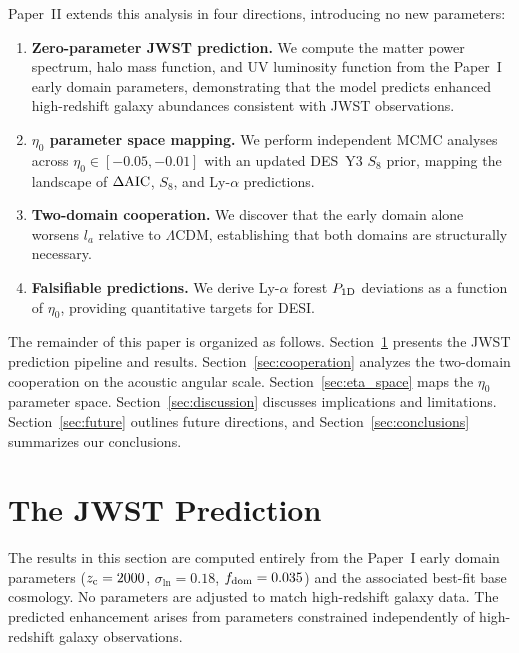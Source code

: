 \documentclass[aps,prd,twocolumn,superscriptaddress,nofootinbib]{revtex4-2}
\newcommand{\fdom}{f_{\rm dom}}
\newcommand{\zc}{z_{\rm c}}
\newcommand{\sln}{\sigma_{\ln}}
\newcommand{\dAIC}{\Delta{\rm AIC}}
\begin{document}
Paper~II extends this analysis in four directions, introducing no
new parameters:
\begin{enumerate}
\item[(a)] \textbf{Zero-parameter JWST prediction.} We compute the
matter power spectrum, halo mass function, and UV luminosity
function from the Paper~I early domain parameters, demonstrating
that the model predicts enhanced high-redshift galaxy abundances
consistent with JWST observations.
\item[(b)] \textbf{$\eta_0$ parameter space mapping.} We perform
independent MCMC analyses across $\eta_0 \in [-0.05, -0.01]$ with
an updated DES~Y3 $S_8$ prior, mapping the landscape of $\dAIC$,
$S_8$, and Ly-$\alpha$ predictions.
\item[(c)] \textbf{Two-domain cooperation.} We discover that the
early domain alone worsens $l_a$ relative to $\Lambda$CDM,
establishing that both domains are structurally necessary.
\item[(d)] \textbf{Falsifiable predictions.} We derive Ly-$\alpha$
forest $P_{1{\rm D}}$ deviations as a function of $\eta_0$,
providing quantitative targets for DESI.
\end{enumerate}

The remainder of this paper is organized as follows.
Section~\ref{sec:jwst} presents the JWST prediction pipeline and
results. Section~\ref{sec:cooperation} analyzes the two-domain
cooperation on the acoustic angular scale.
Section~\ref{sec:eta_space} maps the $\eta_0$ parameter space.
Section~\ref{sec:discussion} discusses implications and limitations.
Section~\ref{sec:future} outlines future directions, and
Section~\ref{sec:conclusions} summarizes our conclusions.


\section{The JWST Prediction}
\label{sec:jwst}

The results in this section are computed entirely from the Paper~I
early domain parameters ($\zc = 2000$, $\sln = 0.18$,
$\fdom = 0.035$) and the associated best-fit base cosmology. No
parameters are adjusted to match high-redshift galaxy data. The
predicted enhancement arises from parameters constrained
independently of high-redshift galaxy observations.
\end{document}
